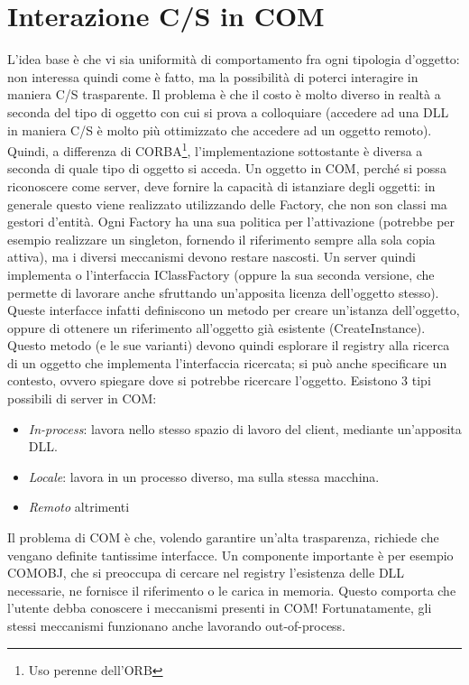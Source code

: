\section{Interazione C/S in COM}
L'idea base è che vi sia uniformità di comportamento fra ogni tipologia d'oggetto: non interessa quindi come è fatto, ma
la possibilità di poterci interagire in maniera C/S trasparente. Il problema è che il costo è molto diverso in realtà a
seconda del tipo di oggetto con cui si prova a colloquiare (accedere ad una DLL in maniera C/S è molto più ottimizzato
che accedere ad un oggetto remoto).
Quindi, a differenza di CORBA\footnote{Uso perenne dell'ORB}, l'implementazione sottostante è diversa a seconda di quale
tipo di oggetto si acceda. Un oggetto in COM, perché si possa riconoscere come server, deve fornire la capacità di
istanziare degli oggetti: in generale questo viene realizzato utilizzando delle Factory, che non son classi ma gestori
d'entità. Ogni Factory ha una sua politica per l'attivazione (potrebbe per esempio realizzare un singleton, fornendo il
riferimento sempre alla sola copia attiva), ma i diversi meccanismi devono restare nascosti.
Un server quindi implementa o l'interfaccia IClassFactory (oppure la sua seconda versione, che permette di lavorare
anche sfruttando un'apposita licenza dell'oggetto stesso). Queste interfacce infatti definiscono un metodo per creare
un'istanza dell'oggetto, oppure di ottenere un riferimento all'oggetto già esistente (CreateInstance). Questo metodo (e
le sue varianti) devono quindi esplorare il registry alla ricerca di un oggetto che implementa l'interfaccia ricercata;
si può anche specificare un contesto, ovvero spiegare dove si potrebbe ricercare l'oggetto.
Esistono 3 tipi possibili di server in COM:
\begin{itemize}
 \item \textit{In-process}: lavora nello stesso spazio di lavoro del client, mediante un'apposita DLL.
 \item \textit{Locale}: lavora in un processo diverso, ma sulla stessa macchina.
 \item \textit{Remoto} altrimenti
\end{itemize}
Il problema di COM è che, volendo garantire un'alta trasparenza, richiede che vengano definite tantissime interfacce.
Un componente importante è per esempio COMOBJ, che si preoccupa di cercare nel registry l'esistenza delle DLL necessarie,
ne fornisce il riferimento o le carica in memoria. Questo comporta che l'utente debba conoscere i meccanismi presenti
in COM! Fortunatamente, gli stessi meccanismi funzionano anche lavorando out-of-process.
